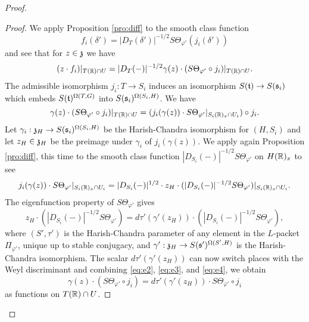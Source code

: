 \documentclass{article}
\theoremstyle{definition}
\numberwithin{equation}{section}
\renewcommand{\-}{\hyp{}}
\begin{document}
\begin{proof}
\begin{proof}
		We apply Proposition \ref{pro:diff} to the smooth class function 
		\[ f_i(\delta') = |D_T(\delta')|^{-1/2}S\Theta_{\varphi'}(j_i(\delta')) \]
		and see that for $z \in \mathfrak{z}$ we have
		\begin{equation} \label{eq:e1}
		(z \cdot f_i)|_{T(\mathbb{R}) \cap U} = |D_T(-)|^{-1/2}\gamma(z) \cdot (S\Theta_{\varphi'}\circ j_i)|_{T(\mathbb{R}) \cap U}.
		\end{equation}
		The admissible isomorphism $j_i : T \to S_i$ induces an isomorphism $S(\mathfrak{t}) \to S(\mathfrak{s}_i)$ which embeds $S(\mathfrak{t})^{\Omega(T,G)}$ into $S(\mathfrak{s}_i)^{\Omega(S_i,H)}$. We have
		\begin{equation} \label{eq:e2}
		\gamma(z) \cdot (S\Theta_{\varphi'}\circ j_i)|_{T(\mathbb{R}) \cap U} = (j_i(\gamma(z)) \cdot S\Theta_{\varphi'}|_{S_i(\mathbb{R})_x \cap U_i}) \circ j_i.
		\end{equation}
		Let $\gamma_i : \mathfrak{z}_H \to S(\mathfrak{s}_i)^{\Omega(S_i,H)}$ be the Harish-Chandra isomorphism for $(H,S_i)$ and let $z_H \in \mathfrak{z}_H$ be the preimage under $\gamma_i$ of $j_i(\gamma(z))$. We apply again Proposition \ref{pro:diff}, this time to the smooth class function $|D_{S_i}(-)|^{-1/2}S\Theta_{\varphi'}$ on $H(\mathbb{R})_x$ to see
		\begin{equation} \label{eq:e3}
		j_i(\gamma(z)) \cdot S\Theta_{\varphi'}|_{S_i(\mathbb{R})_x \cap U_i} = |D_{S_i}(-)|^{1/2}\cdot z_H \cdot (|D_{S_i}(-)|^{-1/2}S\Theta_{\varphi'})|_{S_i(\mathbb{R})_x \cap U_i}.
		\end{equation}
		The eigenfunction property of $S\Theta_{\varphi'}$ gives
		\begin{equation} \label{eq:e4}
		z_H \cdot (|D_{S_i}(-)|^{-1/2}S\Theta_{\varphi'}) = d\tau'(\gamma'(z_H)) \cdot (|D_{S_i}(-)|^{-1/2}S\Theta_{\varphi'}),
		\end{equation}
		where $(S',\tau')$ is the Harish-Chandra parameter of any element in the $L$-packet $\Pi_{\varphi'}$, unique up to stable conjugacy, and $\gamma' : \mathfrak{z}_H \to S(\mathfrak{s'})^{\Omega(S',H)}$ is the Harish-Chandra isomorphism. The scalar $d\tau'(\gamma'(z_H))$ can now switch places with the Weyl discriminant and combining \eqref{eq:e2}, \eqref{eq:e3}, and \eqref{eq:e4}, we obtain
		\begin{equation} \label{eq:e5}
		\gamma(z) \cdot (S\Theta_{\varphi'}\circ j_i) = d\tau'(\gamma'(z_H)) \cdot S\Theta_{\varphi'} \circ j_i 
		\end{equation}
		as functions on $T(\mathbb{R}) \cap U$.
		


\end{proof}
\end{proof}
\end{document}
